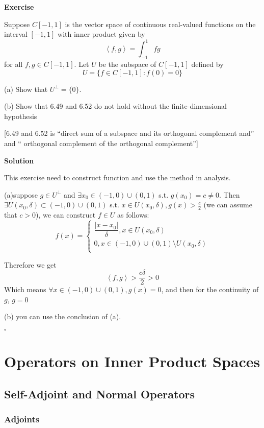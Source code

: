 \documentclass{article}
\newenvironment{exercise}{%
{\textbf{Exercise\\}
    }
}{
}
\newenvironment{solution}{%
{
    \textbf{Solution\\}
    }
}{
  \hfill $\square$ 
  \par\bigskip 
}
\begin{document}
\begin{CJK}{UTF8}{gkai}
\begin{exercise}
    Suppose $C[-1,1]$ is the vector space of continuous real-valued functions on the interval $[-1,1]$ with inner product given by
    \[\left< f, g\right> = \int_{-1}^{1}fg\]
    for all $f, g \in C[-1,1]$. Let $U$ be the subspace of $C[-1,1]$ defined by
    \[U =\{f \in C[-1,1] : f(0) = 0\}\]

    (a) Show that $U^\bot = \{0\}$.

    (b) Show that 6.49 and 6.52 do not hold without the finite-dimensional hypothesis

    [6.49 and 6.52 is ``direct sum of a subspace and its orthogonal complement and'' and `` orthogonal complement of the orthogonal complement'']
\end{exercise}

\begin{solution}
    This exercise need to construct function and use the method in analysis.

    (a)suppose $g \in U^\bot$ and $\exists x_0 \in (-1,0)\cup (0,1)$ s.t. $g(x_0) = c \neq 0$. Then $\exists U(x_0,\delta) \subset (-1,0)\cup (0,1) $ s.t. $x \in U(x_0,\delta), g(x) > \frac{c}{2}$ (we can assume that $c > 0$), we can construct $f \in U$ as follows:
    \[f(x) = \begin{cases}
        \dfrac{|x - x_0|}{\delta} , x \in U(x_0,\delta)\\
        0, x \in (-1,0)\cup (0,1) \setminus U(x_0,\delta)\\
    \end{cases}\]

    Therefore we get \[\left<f,g\right> > \dfrac{c\delta}{2} > 0\]
    Which means $\forall x \in (-1,0)\cup (0,1), g(x) = 0$, and then for the continuity of $g$, $g = 0$

    (b) you can use the conclusion of (a).
\end{solution}
\section{Operators on Inner Product Spaces}

\subsection{Self-Adjoint and Normal Operators}

\subsubsection{Adjoints}


\end{CJK}
\end{document}
